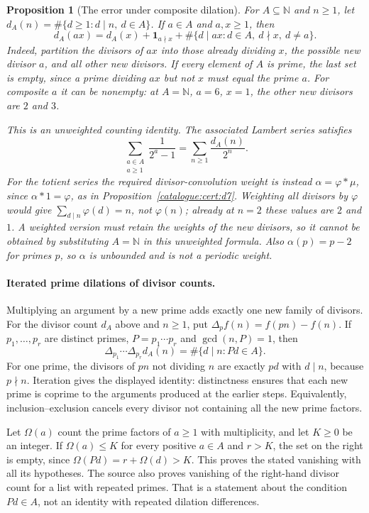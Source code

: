 \documentclass[11pt]{article}
\theoremstyle{plain}
\newtheorem{prop}[thm]{Proposition}
\theoremstyle{definition}
\theoremstyle{remark}
\newcommand{\lean}[2]{\leanlink{#2}}
\begin{document}
\begin{prop}[The error under composite dilation]\label{catalogue:mob:f1}
For $A\subseteq\mathbb N$ and $n\ge1$, let
$d_A(n)=\#\{d\ge1:d\mid n,\ d\in A\}$. If $a\in A$ and $a,x\ge1$, then
\[
 d_A(ax)=d_A(x)+\mathbf 1_{a\nmid x}
       +\#\{d\mid ax:d\in A,\ d\nmid x,\ d\ne a\}.
\]
Indeed, partition the divisors of $ax$ into those already dividing $x$,
the possible new divisor $a$, and all other new divisors. If every element
of $A$ is prime, the last set is empty, since a prime dividing $ax$ but
not $x$ must equal the prime $a$. For composite $a$ it can be nonempty:
at $A=\mathbb N$, $a=6$, $x=1$, the other new divisors are $2$ and $3$.

This is an unweighted counting identity. The associated Lambert series
satisfies
\[
 \sum_{\substack{a\in A\\a\ge1}}\frac1{2^a-1}
 =\sum_{n\ge1}\frac{d_A(n)}{2^n}.
\]
For the totient series the required divisor-convolution weight is instead
$\alpha=\varphi*\mu$, since $\alpha*1=\varphi$, as in
Proposition~\ref{catalogue:cert:d7}. Weighting all divisors by $\varphi$
would give $\sum_{d\mid n}\varphi(d)=n$, not $\varphi(n)$; already at
$n=2$ these values are $2$ and $1$. A weighted version must retain the
weights of the new divisors, so it cannot be obtained by substituting
$A=\mathbb N$ in this unweighted formula. Also $\alpha(p)=p-2$ for primes
$p$, so $\alpha$ is unbounded and is not a periodic weight.
\end{prop}

\paragraph{Iterated prime dilations of divisor counts.}
Multiplying an argument by a new prime adds exactly one new family of
divisors. For the divisor count $d_A$ above and $n\ge1$, put
$\Delta_p f(n)=f(pn)-f(n)$. If $p_1,\ldots,p_r$ are distinct primes,
$P=p_1\cdots p_r$ and $\gcd(n,P)=1$, then
\[
 \Delta_{p_1}\cdots\Delta_{p_r}d_A(n)
       =\#\{d\mid n:Pd\in A\}.
\]
For one prime, the divisors of $pn$ not dividing $n$ are exactly $pd$
with $d\mid n$, because $p\nmid n$. Iteration gives the displayed
identity: distinctness ensures that each new prime is coprime to the
arguments produced at the earlier steps. Equivalently, inclusion--exclusion
cancels every divisor not containing all the new prime factors.

Let $\Omega(a)$ count the prime factors of $a\ge1$ with multiplicity,
and let $K\ge0$ be an integer. If $\Omega(a)\le K$ for every positive $a\in A$ and $r>K$, the set on
the right is empty, since $\Omega(Pd)=r+\Omega(d)>K$.
This proves the stated vanishing with all its hypotheses.
\lean{Erdos249257.SupportDilationDifferences.iteratedDilationDifference_eq_zero_of_cardFactors_le}{SupportDilationDifferences.lean:250}
The source also proves vanishing of the right-hand divisor count for a
list with repeated primes. That is a statement about the condition
$Pd\in A$, not an identity with repeated dilation differences.
\end{document}
